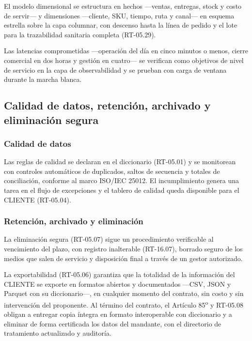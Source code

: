 El modelo dimensional se estructura en hechos ---ventas, entregas, stock y
costo de servir--- y dimensiones ---cliente, SKU, tiempo, ruta y canal--- en
esquema estrella sobre la capa columnar, con descenso hasta la línea de pedido
y el lote para la trazabilidad sanitaria completa (RT-05.29).

Las latencias comprometidas ---operación del día en cinco minutos o menos,
cierre comercial en dos horas y gestión en cuatro--- se verifican como
objetivos de nivel de servicio en la capa de observabilidad y se prueban con
carga de ventana durante la marcha blanca.


\subsection{Calidad de datos, retención, archivado y eliminación segura}
\label{sec:calidad-retencion}

\subsubsection{Calidad de datos}


Las reglas de calidad se declaran en el diccionario (RT-05.01) y se monitorean
con controles automáticos de duplicados, saltos de secuencia y totales de
conciliación, conforme al marco ISO/IEC 25012.  El incumplimiento genera una
tarea en el flujo de excepciones y el tablero de calidad queda disponible para
el CLIENTE (RT-05.04).

\subsubsection{Retención, archivado y eliminación}


La eliminación segura (RT-05.07) sigue un procedimiento verificable al
vencimiento del plazo, con registro inalterable (RT-16.07), borrado seguro de
los medios que salen de servicio y disposición final a través de un gestor
autorizado.

La exportabilidad (RT-05.06) garantiza que la totalidad de la información del
CLIENTE se exporte en formatos abiertos y documentados ---CSV, JSON y Parquet
con su diccionario---, en cualquier momento del contrato, sin costo y sin
intervención del proponente.  Al término del contrato, el Artículo
85\textsuperscript{o} y RT-05.08 obligan a entregar copia íntegra en formato
interoperable con diccionario y a eliminar de forma certificada los datos del
mandante, con el directorio de tratamiento actualizado y auditoría.


